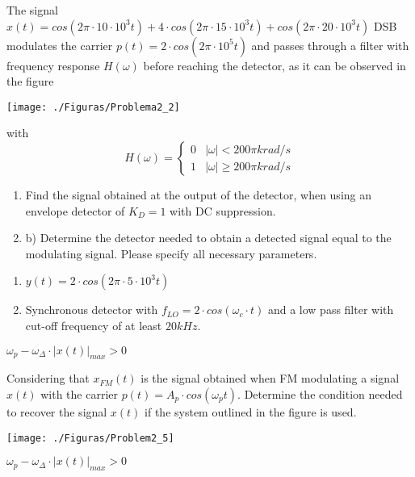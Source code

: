 \documentclass[es,boletin]{uah}
\begin{document}
		{
	
			The signal $x(t) = cos(2\pi\cdot 10\cdot 10^3 t)+4\cdot cos(2\pi\cdot 15 \cdot10^3 t)+cos(2\pi \cdot 20\cdot10^3 t)$ DSB modulates the carrier $p(t)=2\cdot cos(2\pi \cdot 10^5 t)$ and passes through a filter with frequency response $H(\omega)$ before reaching the detector, as it can be observed in the figure
			{\begin{figure*}[h!]\centering\texttt{[image: ./Figuras/Problema2\_2]}\end{figure*}}
		
		
			with
			\begin{displaymath}
				H(\omega)=\left \{ \begin{array}{ll}
					0 & |\omega|<200\pi krad/s  \\
					1 & |\omega|\geq200\pi krad/s
				\end{array}
				\right.
			\end{displaymath}
		
			\begin{enumerate}
				\item Find the signal obtained at the output of the detector, when using an envelope detector of $K_D=1$ with DC suppression. 
				\item b)	Determine the detector needed to obtain a detected signal equal to the modulating signal. Please specify all necessary parameters.
			\end{enumerate} 
			}
			{
				\begin{enumerate}
					\item $y(t)=2\cdot cos(2\pi \cdot 5 \cdot 10^3t)$
					\item Synchronous detector with $f_{LO} = 2 \cdot cos(\omega_c \cdot t)$ 	and a low pass filter with cut-off frequency of at least $20kHz$.
				\end{enumerate}
			}
	



		{
		$\omega_p - \omega_\Delta \cdot |x(t)|_{max} > 0$
		
		}
		{
		
			Considering that $x_{FM}(t)$ is the signal obtained when FM modulating a signal $x(t)$ with the carrier $p(t)=A_p \cdot cos(\omega_p t)$. Determine the condition needed to recover the signal $x(t)$ if the system outlined in the figure is used.
			
			{\begin{figure*}[h!]\centering\texttt{[image: ./Figuras/Problem2\_5]}\end{figure*}}
		}
		{
		$\omega_p - \omega_\Delta \cdot |x(t)|_{max} > 0$
		
		}
		
\end{document}
